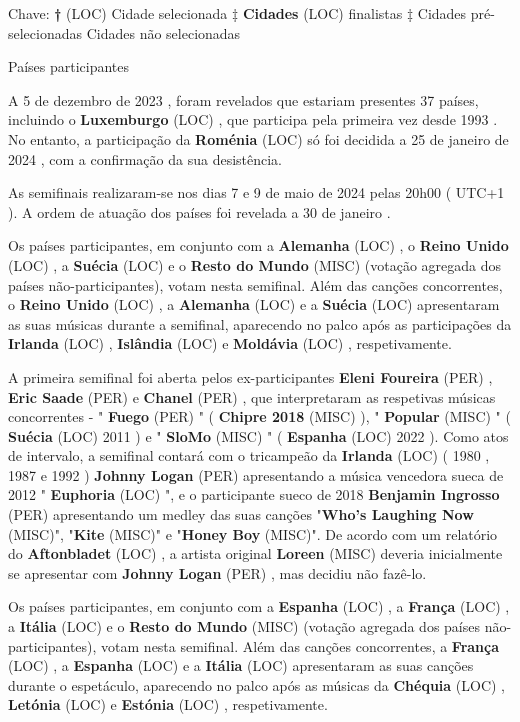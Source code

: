 \documentclass[12pt,a4paper]{article}
\begin{document}
Chave: \textbf{†} (LOC) Cidade selecionada ‡ \textbf{Cidades} (LOC) finalistas ‡ Cidades pré-selecionadas Cidades não selecionadas



Países participantes

A 5 de dezembro de 2023 , foram revelados que estariam presentes 37 países, incluindo o \textbf{Luxemburgo} (LOC) , que participa pela primeira vez desde 1993 . No entanto, a participação da \textbf{Roménia} (LOC) só foi decidida a 25 de janeiro de 2024 , com a confirmação da sua desistência.

As semifinais realizaram-se nos dias 7 e 9 de maio de 2024 pelas 20h00 ( UTC+1 ). A ordem de atuação dos países foi revelada a 30 de janeiro .

Os países participantes, em conjunto com a \textbf{Alemanha} (LOC) , o \textbf{Reino Unido} (LOC) , a \textbf{Suécia} (LOC) e o \textbf{Resto do Mundo} (MISC) (votação agregada dos países não-participantes), votam nesta semifinal. Além das canções concorrentes, o \textbf{Reino Unido} (LOC) , a \textbf{Alemanha} (LOC) e a \textbf{Suécia} (LOC) apresentaram as suas músicas durante a semifinal, aparecendo no palco após as participações da \textbf{Irlanda} (LOC) , \textbf{Islândia} (LOC) e \textbf{Moldávia} (LOC) , respetivamente.

A primeira semifinal foi aberta pelos ex-participantes \textbf{Eleni Foureira} (PER) , \textbf{Eric Saade} (PER) e \textbf{Chanel} (PER) , que interpretaram as respetivas músicas concorrentes - " \textbf{Fuego} (PER) " ( \textbf{Chipre 2018} (MISC) ), " \textbf{Popular} (MISC) " ( \textbf{Suécia} (LOC) 2011 ) e " \textbf{SloMo} (MISC) " ( \textbf{Espanha} (LOC) 2022 ). Como atos de intervalo, a semifinal contará com o tricampeão da \textbf{Irlanda} (LOC) ( 1980 , 1987 e 1992 ) \textbf{Johnny Logan} (PER) apresentando a música vencedora sueca de 2012 " \textbf{Euphoria} (LOC) ", e o participante sueco de 2018 \textbf{Benjamin Ingrosso} (PER) apresentando um medley das suas canções "\textbf{Who's Laughing Now} (MISC)", "\textbf{Kite} (MISC)" e "\textbf{Honey Boy} (MISC)". De acordo com um relatório do \textbf{Aftonbladet} (LOC) , a artista original \textbf{Loreen} (MISC) deveria inicialmente se apresentar com \textbf{Johnny Logan} (PER) , mas decidiu não fazê-lo.

Os países participantes, em conjunto com a \textbf{Espanha} (LOC) , a \textbf{França} (LOC) , a \textbf{Itália} (LOC) e o \textbf{Resto do Mundo} (MISC) (votação agregada dos países não-participantes), votam nesta semifinal. Além das canções concorrentes, a \textbf{França} (LOC) , a \textbf{Espanha} (LOC) e a \textbf{Itália} (LOC) apresentaram as suas canções durante o espetáculo, aparecendo no palco após as músicas da \textbf{Chéquia} (LOC) , \textbf{Letónia} (LOC) e \textbf{Estónia} (LOC) , respetivamente.
\end{document}
